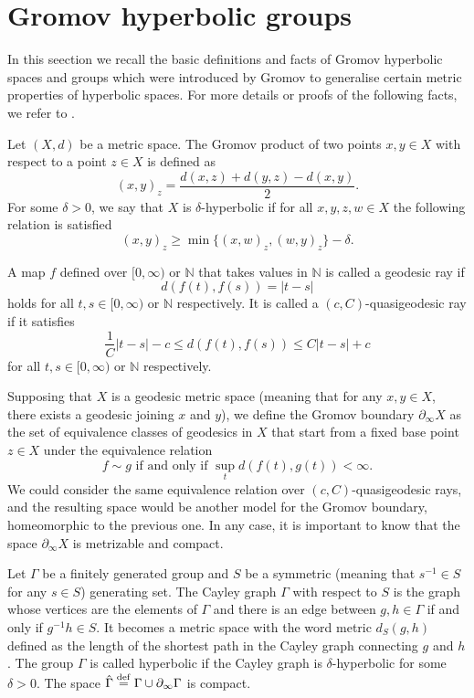 \documentclass{report}
\begin{document}
\section{Gromov hyperbolic groups}
In this seection we recall the basic definitions and facts of Gromov hyperbolic spaces and groups which were introduced by Gromov to generalise certain metric properties of hyperbolic spaces.
For more details or proofs of the following facts, we refer to \cite{ghys2013groupes}.

Let $(X, d)$ be a metric space.
The Gromov product of two points $x, y \in X$ with respect to a point $z \in X$ is defined as
\[
(x, y)_z = \frac{d(x,z) + d(y,z) - d(x,y)}{2}.
\]
For some $\delta > 0$, we say that $X$ is $\delta$-hyperbolic if for all $x,y,z,w \in X$ the following relation is satisfied
\[
(x, y)_z \geq \min \{ (x, w)_z, (w, y)_z \} - \delta.
\]

A map $f$ defined over $[0, \infty)$ or $\mathbb N$ that takes values in $\mathbb N$ is called a geodesic ray if 
$$d(f(t), f(s)) = |t-s|$$
 holds for all $t, s \in \mathbb [0, \infty)$ or $\mathbb N$ respectively.
It is called a $(c, C)$-quasigeodesic ray if it satisfies 
$$\frac{1}{C}|t-s| - c \leq d(f(t), f(s)) \leq C|t-s| + c$$
for all $t, s \in \mathbb [0, \infty)$ or $\mathbb N$ respectively.

Supposing that $X$ is a geodesic metric space (meaning that for any $x,y \in X$, there exists a geodesic joining $x$ and $y$), we define the Gromov boundary $\partial_\infty X$ as the set of equivalence classes of geodesics in $X$ that start from a fixed base point $z \in X$ under the equivalence relation
\[
f \sim g \text{ if and only if } \sup_t d(f(t), g(t)) < \infty.
\]
We could consider the same equivalence relation over $(c,C)$-quasigeodesic rays, and the resulting space would be another model for the Gromov boundary, homeomorphic to the previous one. 
In any case, it is important to know that the space $\partial_\infty X$ is metrizable and compact.

Let $\Gamma$ be a finitely generated group and $S$ be a symmetric (meaning that $s^{-1} \in S$ for any $s \in S$) generating set.
The Cayley graph $\Gamma$ with respect to $S$ is the graph whose vertices are the elements of $\Gamma$ and there is an edge between $g, h \in \Gamma$ if and only if $g^{-1}h \in S$.
It becomes a metric space with the word metric $d_S(g,h)$ defined as the length of the shortest path in the Cayley graph connecting $g$ and $h$.
The group $\Gamma$ is called hyperbolic if the Cayley graph is $\delta$-hyperbolic for some $\delta > 0$.
The space $\hat \Gamma \overset{\mathrm{def}}{=} \Gamma \cup \partial_\infty \Gamma$ is compact.
\end{document}
